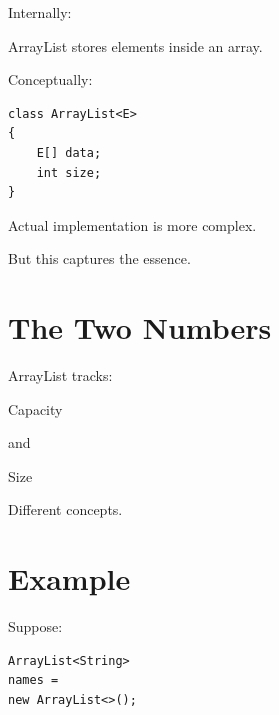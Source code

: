 \documentclass[11pt,a4paper]{book}
\begin{document}
Internally:


ArrayList stores elements
inside an array.


Conceptually:

\begin{verbatim} 
class ArrayList<E>
{
    E[] data;
    int size;
}
\end{verbatim}


Actual implementation is more complex.


But this captures the essence.


\section{The Two Numbers}

ArrayList tracks:


Capacity


and


Size


Different concepts.


\section{Example}

Suppose:

\begin{verbatim} 
ArrayList<String>
names =
new ArrayList<>();
\end{verbatim}

\end{document}
